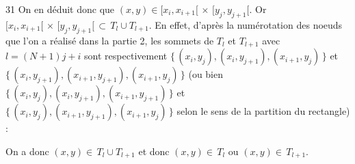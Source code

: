 \begin{reponse}{31}
On en déduit donc que $(x,y) \in [x_i,x_{i+1}[ \, \times \,  [y_j,y_{j+1}[$. Or $[x_i,x_{i+1}[ \, \times \,  [y_j,y_{j+1}[ \, \subset \,  T_l \cup T_{l+1}$. En effet, d'après la numérotation des noeuds que l'on a réalisé dans la partie 2, les sommets de $T_l$ et $T_{l+1}$ avec $l=(N+1)j+i$ sont respectivement $\{ \, (x_i,y_j), (x_i, y_{j+1}), (x_{i+1}, y_j) \, \}$ et $\{ \, (x_i,y_{j+1}), (x_{i+1}, y_{j+1}), (x_{i+1}, y_j) \, \}$ (ou bien $\{ \, (x_i,y_j), (x_i, y_{j+1}), (x_{i+1}, y_{j+1}) \, \}$ et $\{ \, (x_i,y_j), (x_{i+1}, y_{j+1}), (x_{i+1}, y_j) \, \}$ selon le sens de la partition du rectangle) :

\begin{center}
\end{center}

On a donc $(x,y) \in \, T_l \cup T_{l+1}$ et donc $(x,y) \in \, T_l$ ou $(x,y) \in \, T_{l+1}$.

\end{reponse}


